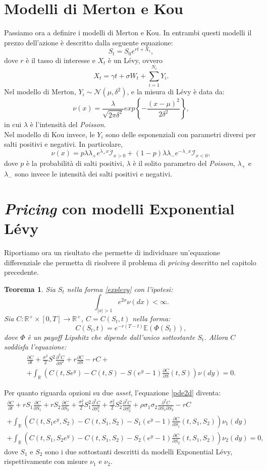 \documentclass[a4paper,10pt]{report}
\newcommand{\der}[2]{\frac{\partial #1}{\partial #2}}
\newcommand{\dder}[2]{\frac{\partial^2 #1}{\partial #2^2}}
\newcommand{\dmix}[3]{\frac{\partial^2 #1}{\partial #2 \partial #3}}
\newtheorem{theorem}{Teorema}[chapter]
\theoremstyle{osservazione}
\theoremstyle{esempio}
\theoremstyle{notazione}
\theoremstyle{corollario}
\begin{document}
\section{Modelli di Merton e Kou}
Passiamo ora a definire i modelli di Merton e Kou. In entrambi questi modelli il prezzo dell'azione \`e descritto dalla seguente equazione:
\begin{equation}
S_t=S_0e^{rt+X_t},
\label{explevy}
\end{equation}
dove $r$ \`e il tasso di interesse e $X_t$ \`e un L\'evy, ovvero $$X_t=\gamma t+\sigma W_t+\sum_{i=1}^{N_t}Y_i.$$Nel modello di Merton, $Y_i\sim\mathcal{N}(\mu, \delta^2)$, e la misura di L\'evy \`e data da: $$\nu(x)=\frac{\lambda}{\sqrt{2\pi\delta^2}}exp\left\{-\frac{(x-\mu)^2}{2\delta^2}\right\},$$in cui $\lambda$ \`e l'intensit\`a del \emph{Poisson}.\\Nel modello di Kou invece, le $Y_i$ sono delle esponenziali con parametri diversi per salti positivi e negativi. In particolare, $$\nu(x)=p\lambda\lambda_+e^{\lambda_+x}\mathcal{I}_{x>0}+(1-p)\lambda\lambda_-e^{-\lambda_-x}\mathcal{I}_{x<0},$$dove $p$ \`e la probabilit\`a di salti positivi, $\lambda$ \`e il solito parametro del \emph{Poisson}, $\lambda_+$ e $\lambda_-$ sono invece le intensit\`a dei salti positivi e negativi.
\section{\emph{Pricing} con modelli Exponential L\'evy}
Riportiamo ora un risultato che permette di individuare un'equazione differenziale che permetta di risolvere il problema di \emph{pricing} descritto nel capitolo precedente.
\begin{theorem}
Sia $S_t$ nella forma \ref{explevy} con l'ipotesi: $$\int_{|x|>1} e^{2x}\nu(dx)<\infty.$$ Sia $C:\mathbb{R}^+\times[0,T]\rightarrow\mathbb{R}^+$, $C=C(S_t,t)$ nella forma: $$C(S_t,t)=e^{-r(T-t)}\mathbb{E}(\Phi(S_t)),$$ dove $\Phi$ \`e un \emph{payoff Lipshitz} che dipende dall'unico sottostante $S_t$. Allora $C$ soddisfa l'equazione:
\begin{multline}
\der{C}{t}+\frac{\sigma^2}{2}S^2\dder{C}{S}+r\der{C}{S}-rC+\\+ \int_\mathbb{R}\left(C(t,Se^y)-C(t,S)-S(e^y-1)\der{C}{S}(t,S)\right)\nu(dy)=0.
\end{multline}
\end{theorem}
Per quanto riguarda opzioni su due \emph{asset}, l'equazione \ref{pde2d} diventa:
\begin{multline}
\der{C}{t}+rS_1\der{C}{S_1}+rS_2\der{C}{S_2}+\frac{\sigma^2_1}{2}S_1^2\dder{C}{S_1}+\frac{\sigma^2_2}{2}S_2^2\dder{C}{S_2}+\rho\sigma_1\sigma_2\dmix{C}{S_1}{S_2}-rC\\+\int_\mathbb{R}\left(C(t,S_1e^y,S_2)-C(t,S_1,S_2)-S_1(e^y-1)\der{C}{S_1}(t,S_1,S_2)\right)\nu_1(dy)\\+\int_\mathbb{R}\left(C(t,S_1,S_2e^y)-C(t,S_1,S_2)-S_2(e^y-1)\der{C}{S_2}(t,S_1,S_2)\right)\nu_2(dy)=0,
\end{multline}
dove $S_1$ e $S_2$ sono i due sottostanti descritti da modelli Exponential L\'evy, rispettivamente con misure $\nu_1$ e $\nu_2$.
\end{document}
